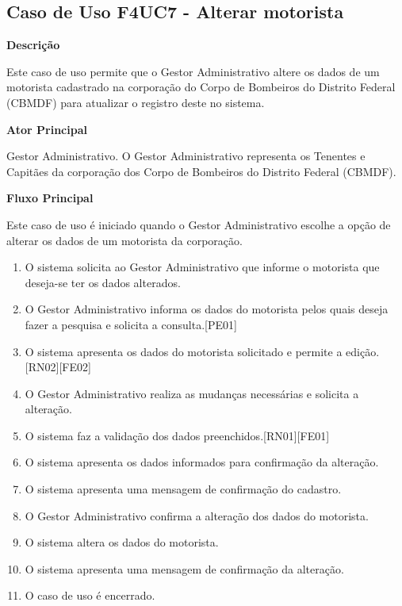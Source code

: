 
  \subsection{Caso de Uso F4UC7 - Alterar motorista}

  {\raggedright
      \textbf{Descrição}
  }

    Este caso de uso permite que o Gestor Administrativo altere os dados de um motorista cadastrado na corporação do Corpo de Bombeiros
    do Distrito Federal (CBMDF) para atualizar o registro deste no sistema.
    
  {\raggedright
      \textbf{Ator Principal}
  }

    Gestor Administrativo. O Gestor Administrativo representa os Tenentes e Capitães da corporação dos Corpo de Bombeiros do Distrito
    Federal (CBMDF).

  {\raggedright
      \textbf{Fluxo Principal}
  }
  
    Este caso de uso é iniciado quando o Gestor Administrativo escolhe a opção de alterar os dados de um motorista da corporação.
    
  
  \begin{enumerate}
    \item O sistema solicita ao Gestor Administrativo que informe o motorista que deseja-se ter os dados alterados.
    \item O Gestor Administrativo  informa os dados do motorista pelos quais deseja fazer a pesquisa e solicita a consulta.[PE01]
    \item O sistema apresenta os dados do motorista solicitado e permite a edição.[RN02][FE02]
    \item O Gestor Administrativo realiza as mudanças necessárias e solicita a alteração.
    \item O sistema faz a validação dos dados preenchidos.[RN01][FE01]
    \item O sistema apresenta os dados informados para confirmação da alteração.
    \item O sistema apresenta uma mensagem de confirmação do cadastro.
    \item O Gestor Administrativo confirma a alteração dos dados do motorista.
    \item O sistema altera os dados do motorista.
    \item O sistema apresenta uma mensagem de confirmação da alteração.
    \item O caso de uso é encerrado.
    
  \end{enumerate}
  
